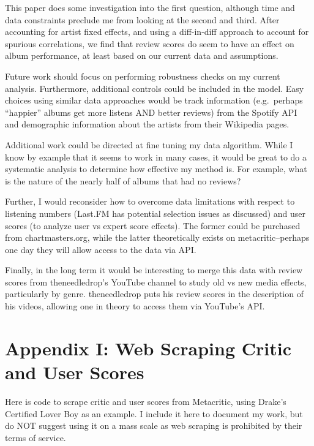 \documentclass[
  11pt,
]{article}
\begin{document}
This paper does some investigation into the first question, although
time and data constraints preclude me from looking at the second and
third. After accounting for artist fixed effects, and using a
diff-in-diff approach to account for spurious correlations, we find that
review scores do seem to have an effect on album performance, at least
based on our current data and assumptions.

Future work should focus on performing robustness checks on my current
analysis. Furthermore, additional controls could be included in the
model. Easy choices using similar data approaches would be track
information (e.g.~perhaps ``happier'' albums get more listens AND better
reviews) from the Spotify API and demographic information about the
artists from their Wikipedia pages.

Additional work could be directed at fine tuning my data algorithm.
While I know by example that it seems to work in many cases, it would be
great to do a systematic analysis to determine how effective my method
is. For example, what is the nature of the nearly half of albums that
had no reviews?

Further, I would reconsider how to overcome data limitations with
respect to listening numbers (Last.FM has potential selection issues as
discussed) and user scores (to analyze user vs expert score effects).
The former could be purchased from chartmasters.org, while the latter
theoretically exists on metacritic--perhaps one day they will allow
access to the data via API.

Finally, in the long term it would be interesting to merge this data
with review scores from theneedledrop's YouTube channel to study old vs
new media effects, particularly by genre. theneedledrop puts his review
scores in the description of his videos, allowing one in theory to
access them via YouTube's API.

\newpage

\hypertarget{appendix-i-web-scraping-critic-and-user-scores}{%
\section{Appendix I: Web Scraping Critic and User
Scores}\label{appendix-i-web-scraping-critic-and-user-scores}}

Here is code to scrape critic and user scores from Metacritic, using
Drake's Certified Lover Boy as an example. I include it here to document
my work, but do NOT suggest using it on a mass scale as web scraping is
prohibited by their terms of service.
\end{document}
